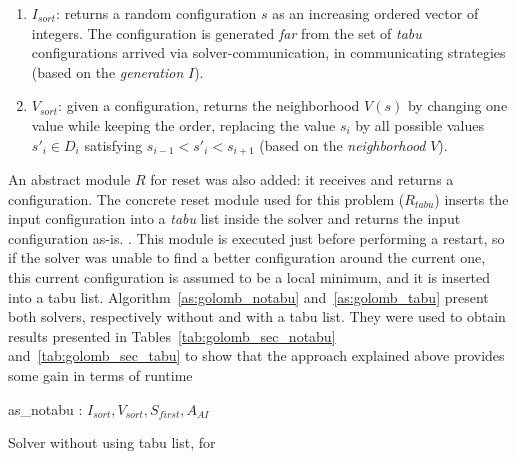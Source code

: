 \begin{enumerate}
	\item$I_{sort}$: returns a random configuration $s$ as an increasing ordered vector of integers. The configuration is generated \textit{far} from the set of {\it tabu} configurations arrived via solver-communication, in communicating strategies (based on the \textit{generation} \absm{} $I$).
	\item $V_{sort}$: given a configuration, returns the neighborhood $V\left(s\right)$ by changing one value while keeping the order, \ie replacing the value $s_i$ by all possible values $s'_i \in D_i$ satisfying $s_{i-1} < s'_i < s_{i+1}$ (based on the \textit{neighborhood} \absm{} $V$).
\end{enumerate}

An abstract module $R$ for reset was also added: it receives and returns a configuration. The concrete reset module used for this problem ($R_{tabu}$) inserts the input configuration into a \textit{tabu} list inside the solver and returns the input configuration as-is. . This module is executed just before performing a restart, so if the solver was unable to find a better configuration around the current one, this current configuration is assumed to be a local minimum, and it is inserted into a tabu list.  Algorithm~\ref{as:golomb_notabu} and~\ref{as:golomb_tabu} present both solvers, respectively without and with a tabu list. They were used to obtain results presented in Tables~\ref{tab:golomb_sec_notabu} and~\ref{tab:golomb_sec_tabu} to show that the approach explained above provides some gain in terms of runtime  

\begin{algorithm}[H]
\dontprintsemicolon
\SetNoline
{}
   as\_notabu\;
\algoindent {} : $I_{sort}, V_{sort}, S_{first}, A_{AI}$ \;
\caption{Solver without using tabu list, for \GRP}\label{as:golomb_notabu}
\end{algorithm}

